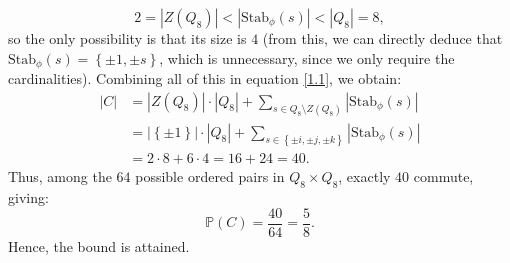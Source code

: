 \begin{solution}
    \[
        2 = \left| Z\left( Q_8 \right) \right| < \left| \mathrm{Stab}_{\phi}\left( s \right) \right| < \left| Q_8 \right|=8,
    \]
    so the only possibility is that its size is \( 4 \) (from this, we can directly deduce that \( \mathrm{Stab}_{\phi}\left( s \right) = \left\{ \pm 1, \pm s \right\} \), which is unnecessary, since we only require the cardinalities). Combining all of this in equation \eqref{1.1}, we obtain:
    \begin{align*}
        |C| &= \left| Z(Q_8) \right| \cdot \left| Q_8 \right| + \sum_{s \in Q_8\setminus Z(Q_8)} \left| \mathrm{Stab}_{\phi}\left( s \right) \right|\\
        &=\left| \left\{ \pm 1 \right\} \right| \cdot \left| Q_8 \right| + \sum_{s \in \left\{ \pm i, \pm j, \pm k \right\}} \left| \mathrm{Stab}_{\phi}\left( s \right) \right|\\
        &= 2 \cdot 8 + 6 \cdot 4 = 16 + 24 = 40.
    \end{align*}
    Thus, among the \( 64 \) possible ordered pairs in \( Q_8 \times Q_8 \), exactly \( 40 \) commute, giving:
    \[
        \mathbb{P}\left(C\right) = \frac{40}{64} = \frac{5}{8}.
    \]
    Hence, the bound is attained.
\end{solution}
